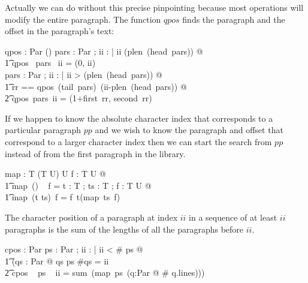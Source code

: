 \documentclass{article}
\begin{document}
Actually we can do without this precise pinpointing because most operations will modify the entire paragraph. The function $qpos$ finds the paragraph and the offset in the paragraph's text:

\begin{axdef}
	qpos : \seq Par \pfun \nat \fun (\nat \cross \nat)
\where
	\forall pars : \seq Par ; ii : \nat | ii \leq (plen~(head~pars)) @ \\
	\t1 qpos ~pars ~ii = (0, ii) \\
	\forall pars : \seq Par ; ii : \nat | ii > (plen~(head~pars)) @ \\
	\t1 \LET rr == qpos~(tail~pars)~(ii-plen~(head~pars)) @ \\
	\t2    qpos~pars~ii = (1+first~rr, second~rr)
\end{axdef}

If we happen to know the absolute character index that corresponds to a particular paragraph $pp$ and we wish to know the paragraph and offset that correspond to a larger character index then we can start the search from $pp$ instead of from the first paragraph in the library. 


\begin{gendef}[T,U]
	map : \seq T \fun (T \fun U) \fun \seq U
\where
	\forall f : T \fun U @ \\
	\t1 map~(\langle\rangle) ~ f = \langle\rangle
\also
	\forall t : T ; ts : \seq T ; f : T \fun U @ \\
	\t1 map~(\langle t \rangle \cat ts)~f = \langle f~t\rangle\cat (map~ts~f)
\end{gendef}

The character position of a paragraph at index $ii$ in a sequence of at least $ii$ paragraphs is the sum of the lengths of all the paragraphs before $ii$.

\begin{axdef}
	cpos : \seq Par \fun \nat \pfun \nat
\where
	\forall ps : \seq Par ; ii : \nat | ii < \# ps @ \\
	\t1 (\exists qs : \seq Par @ qs \prefix ps \land \#qs = ii \land {} \\
	\t2    cpos ~ ps ~ ii = sum~(map~ps~(\lambda q:Par @ \# q.lines)))
\end{axdef}
\end{document}

